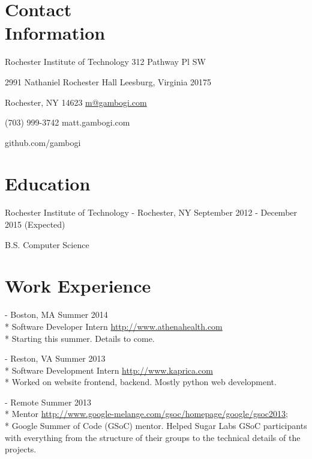 \documentclass[letter,margin,line]{resume}
\newcommand{\rurl}[1]{\hfill {\footnotesize \url{#1}}}
\newcommand{\rdate}[1]{\hfill {\small #1}}
\renewcommand{\employer}[5]{\item[#1] - #2 \rdate{#3} \\* #4 \rurl{#5} \\*}
\begin{document}
\begin{resume}
\section{\mysidestyle Contact \\ Information} \vspace{2mm}
	\begin{asparablank}
		\item Rochester Institute of Technology \hfill 312 Pathway Pl SW
		\item 2991 Nathaniel Rochester Hall \hfill Leesburg, Virginia 20175
		\item Rochester, NY 14623 \hfill
		\href{mailto:m@gambogi.com}{m@gambogi.com}
		\item (703) 999-3742 \hfill {matt.gambogi.com}
		\item \hfill github.com/gambogi
	\end{asparablank}

\section{\mysidestyle Education}
	\begin{compactdesc}
		\item[Rochester Institute of Technology] - Rochester, NY \rdate{September 2012 - December 2015 (Expected)}
		\item B.S. Computer Science
	\end{compactdesc}

\section{\mysidestyle Work Experience}
	\begin{asparadesc}
        \employer{athenahealth}{Boston, MA}{Summer 2014}{Software Developer Intern}{http://www.athenahealth.com}
        Starting this summer. Details to come.
        \\
		\employer{Kaprica Security}{Reston, VA}{Summer 2013}{Software Development Intern}{http://www.kaprica.com}
		Worked on website frontend, backend. Mostly python web development. 
        \\
        \normalsize\employer{Google Summer of Code, Sugar Labs}{Remote}{Summer 2013}{Mentor}{http://www.google-melange.com/gsoc/homepage/google/gsoc2013;}
        	Google Summer of Code (GSoC) mentor. Helped Sugar Labs GSoC participants with everything from the structure of their groups to the technical details of the projects.
		\normalsize
		\\


\end{asparadesc}
\end{resume}
\end{document}
